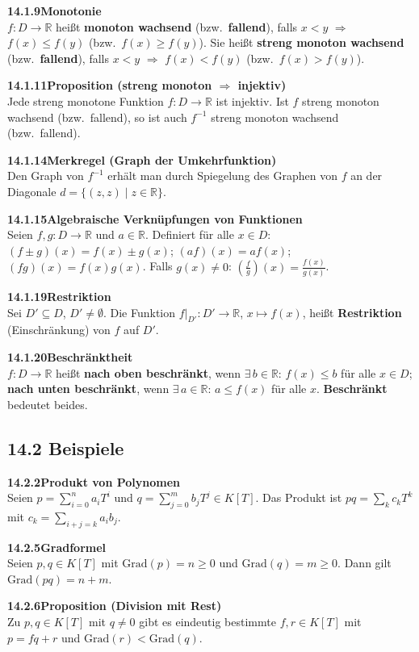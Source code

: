 \documentclass[a4paper,12pt]{article}
\newcommand{\gentry}[3]{%
  \noindent\textbf{#1\quad #2}\nopagebreak\\[0.2em]
  #3\par\smallskip
}
\begin{document}
\gentry{14.1.9}{Monotonie}{%
  $f: D \to \mathbb{R}$ heißt \textbf{monoton wachsend} (bzw.\ \textbf{fallend}),
  falls $x < y$ $\Rightarrow$ $f(x) \le f(y)$ (bzw.\ $f(x) \ge f(y)$).
  Sie heißt \textbf{streng monoton wachsend} (bzw.\ \textbf{fallend}),
  falls $x < y$ $\Rightarrow$ $f(x) < f(y)$ (bzw.\ $f(x) > f(y)$).
}

\gentry{14.1.11}{Proposition (streng monoton $\Rightarrow$ injektiv)}{%
  Jede streng monotone Funktion $f: D \to \mathbb{R}$ ist injektiv.
  Ist $f$ streng monoton wachsend (bzw.\ fallend), so ist auch $f^{-1}$ streng
  monoton wachsend (bzw.\ fallend).
}

\gentry{14.1.14}{Merkregel (Graph der Umkehrfunktion)}{%
  Den Graph von $f^{-1}$ erhält man durch Spiegelung des Graphen von $f$
  an der Diagonale $d = \{(z, z) \mid z \in \mathbb{R}\}$.
}

\gentry{14.1.15}{Algebraische Verknüpfungen von Funktionen}{%
  Seien $f, g: D \to \mathbb{R}$ und $a \in \mathbb{R}$. Definiert für alle $x \in D$:
  $(f \pm g)(x) = f(x) \pm g(x)$;\; $(af)(x) = af(x)$;\; $(fg)(x) = f(x)g(x)$.
  Falls $g(x) \neq 0$: $\left(\frac{f}{g}\right)(x) = \frac{f(x)}{g(x)}$.
}

\gentry{14.1.19}{Restriktion}{%
  Sei $D' \subseteq D$, $D' \neq \emptyset$. Die Funktion
  $f|_{D'}: D' \to \mathbb{R}$, $x \mapsto f(x)$, heißt \textbf{Restriktion}
  (Einschränkung) von $f$ auf $D'$.
}

\gentry{14.1.20}{Beschränktheit}{%
  $f: D \to \mathbb{R}$ heißt \textbf{nach oben beschränkt}, wenn $\exists\, b \in \mathbb{R}$:
  $f(x) \le b$ für alle $x \in D$; \textbf{nach unten beschränkt}, wenn
  $\exists\, a \in \mathbb{R}$: $a \le f(x)$ für alle $x$. \textbf{Beschränkt}
  bedeutet beides.
}

\subsection*{14.2 \quad Beispiele}

\gentry{14.2.2}{Produkt von Polynomen}{%
  Seien $p = \sum_{i=0}^n a_i T^i$ und $q = \sum_{j=0}^m b_j T^j \in K[T]$.
  Das Produkt ist $pq = \sum_k c_k T^k$ mit
  $c_k = \sum_{i+j=k} a_i b_j$.
}

\gentry{14.2.5}{Gradformel}{%
  Seien $p, q \in K[T]$ mit $\mathrm{Grad}(p) = n \ge 0$ und $\mathrm{Grad}(q) = m \ge 0$.
  Dann gilt $\mathrm{Grad}(pq) = n + m$.
}

\gentry{14.2.6}{Proposition (Division mit Rest)}{%
  Zu $p, q \in K[T]$ mit $q \neq 0$ gibt es eindeutig bestimmte $f, r \in K[T]$
  mit $p = fq + r$ und $\mathrm{Grad}(r) < \mathrm{Grad}(q)$.
}
\end{document}
